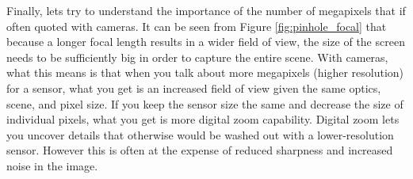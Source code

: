 \documentclass{../template/texnote}
\begin{document}





Finally, lets try to understand the importance of the number of megapixels that if often quoted with cameras. It can be seen from Figure \ref{fig:pinhole_focal} that because a longer focal length results in a wider field of view, the size of the screen needs to be sufficiently big in order to capture the entire scene.
With cameras, what this means is that when you talk about more megapixels (higher resolution) for a sensor, what you get is an increased field of view given the same optics, scene, and pixel size.
If you keep the sensor size the same and decrease the size of individual pixels, what you get is more digital zoom capability. Digital zoom lets you uncover details that otherwise would be washed out with a lower-resolution sensor. However this is often at the expense of reduced sharpness and increased noise in the image.

\end{document}
